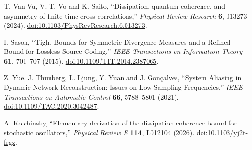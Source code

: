 T. Van Vu, V. T. Vo and K. Saito,
``Dissipation, quantum coherence, and asymmetry of finite-time cross-correlations,''
\emph{Physical Review Research} \textbf{6}, 013273 (2024).
\href{https://doi.org/10.1103/PhysRevResearch.6.013273}{doi:10.1103/PhysRevResearch.6.013273}.

I. Sason,
``Tight Bounds for Symmetric Divergence Measures and a Refined Bound for Lossless Source Coding,''
\emph{IEEE Transactions on Information Theory} \textbf{61}, 701--707 (2015).
\href{https://doi.org/10.1109/TIT.2014.2387065}{doi:10.1109/TIT.2014.2387065}.

Z. Yue, J. Thunberg, L. Ljung, Y. Yuan and J. Gon\c{c}alves,
``System Aliasing in Dynamic Network Reconstruction: Issues on Low Sampling Frequencies,''
\emph{IEEE Transactions on Automatic Control} \textbf{66}, 5788--5801 (2021).
\href{https://doi.org/10.1109/TAC.2020.3042487}{doi:10.1109/TAC.2020.3042487}.

A. Kolchinsky,
``Elementary derivation of the dissipation-coherence bound for stochastic oscillators,''
\emph{Physical Review E} \textbf{114}, L012104 (2026).
\href{https://doi.org/10.1103/yj2t-frgz}{doi:10.1103/yj2t-frgz}.
